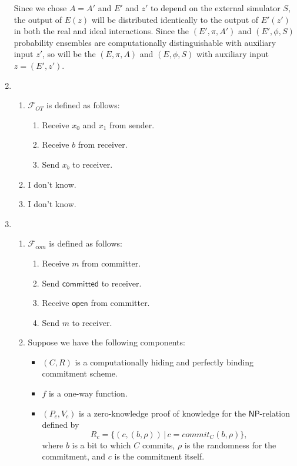 \documentclass[draft]{article}
\newcommand{\class}[1]{{\ensuremath{\mathsf{#1}}}}
\newcommand{\NP}{\class{NP}}
\begin{document}
\begin{enumerate}
  Since we chose $A=A'$ and $E'$ and $z'$ to depend on the external simulator $S$, the output of $E(z)$ will be distributed identically to the output of $E'(z')$ in both the real and ideal interactions.
  Since the $(E', \pi, A')$ and $(E', \phi, S)$ probability ensembles are computationally distinguishable with auxiliary input $z'$, so will be the $(E, \pi, A)$ and $(E, \phi, S)$ with auxiliary input $z=(E', z')$.
\item
  \begin{enumerate}
  \item $\mathcal{F}_{OT}$ is defined as follows:
    \begin{enumerate}
    \item Receive $x_0$ and $x_1$ from sender.
    \item Receive $b$ from receiver.
    \item Send $x_b$ to receiver.
    \end{enumerate}
  \item I don't know.
  \item I don't know.
  \end{enumerate}
\item
  \begin{enumerate}
  \item $\mathcal{F}_{com}$ is defined as follows:
    \begin{enumerate}
    \item Receive $m$ from committer.
    \item Send $\textsf{committed}$ to receiver.
    \item Receive $\textsf{open}$ from committer.
    \item Send $m$ to receiver.
    \end{enumerate}
  \item
    Suppose we have the following components:
    \begin{itemize}
    \item $(C, R)$ is a computationally hiding and perfectly binding commitment scheme.
    \item $f$ is a one-way function.
    \item
      $(P_c, V_c)$ is a zero-knowledge proof of knowledge for the \NP-relation defined by
      \begin{displaymath}
        R_c=\{(c, (b, \rho)) \,|\, c=commit_C(b, \rho) \},
      \end{displaymath}
      where $b$ is a bit to which $C$ commits, $\rho$ is the randomness for the commitment, and $c$ is the commitment itself.

\end{itemize}
\end{enumerate}
\end{enumerate}
\end{document}
